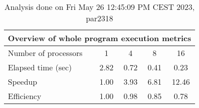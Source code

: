 \begin{table}[h]
\begin{center}
\begin{tabular}{|l|c|c|c|c|}
\hline
\multicolumn{5}{|c|}{Overview of whole program execution metrics} \\
\hline
\hline
Number of processors & 1 & 4 & 8 & 16 \\
\hline
Elapsed time (sec)      &       2.82 &       0.72 &       0.41 &       0.23 \\
\hline
Speedup                 &       1.00 &       3.93 &       6.81 &      12.46 \\
\hline
Efficiency              &       1.00 &       0.98 &       0.85 &       0.78 \\
\hline
\end{tabular}
\end{center}
\caption{ Analysis done on Fri May 26 12:45:09 PM CEST 2023, par2318}
\end{table}
